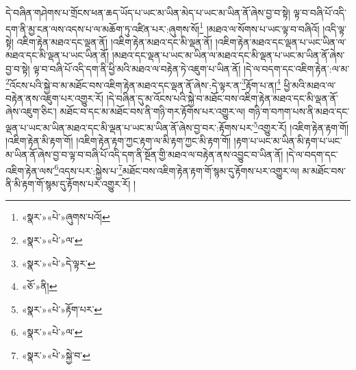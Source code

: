 དེ་བཞིན་གཤེགས་པ་གྲོངས་ཕན་ཆད་ཡོད་པ་ཡང་མ་ཡིན་མེད་པ་ཡང་མ་ཡིན་ནོ་ཞེས་བྱ་བ་སྟེ། ལྟ་བ་བཞི་པོ་འདི་དག་ནི་མྱ་ངན་ལས་འདས་པ་ལ་མཆོག་ཏུ་འཛིན་པར་:ཞུགས་སོ།\footnote{«སྣར་»«པེ་»ཞུགས་པའོ།} །མཐའ་ལ་སོགས་པ་ཡང་ལྟ་བ་བཞིའོ། །འདི་ལྟ་སྟེ། འཇིག་རྟེན་མཐའ་དང་ལྡན་ནོ། །འཇིག་རྟེན་མཐའ་དང་མི་ལྡན་ནོ། །འཇིག་རྟེན་མཐའ་དང་ལྡན་པ་ཡང་ཡིན་ལ་མཐའ་དང་མི་ལྡན་པ་ཡང་ཡིན་ནོ། །མཐའ་དང་ལྡན་པ་ཡང་མ་ཡིན་ལ་མཐའ་དང་མི་ལྡན་པ་ཡང་མ་ཡིན་ནོ་ཞེས་བྱ་བ་སྟེ། ལྟ་བ་བཞི་པོ་འདི་དག་ནི་ཕྱི་མའི་མཐའ་ལ་བརྟེན་ཏེ་འཇུག་པ་ཡིན་ནོ། །དེ་ལ་བདག་དང་འཇིག་རྟེན་:ལ་མ་\footnote{«སྣར་»«པེ་»ལ་}འོངས་པའི་སྐྱེ་བ་མ་མཐོང་བས་འཇིག་རྟེན་མཐའ་དང་ལྡན་ནོ་ཞེས་:དེ་ལྟར་ན་\footnote{«སྣར་»«པེ་»དེ་ལྟར་}རྟོག་པ་ན།\footnote{«ཅོ་»ནི།} ཕྱི་མའི་མཐའ་ལ་བརྟེན་ནས་འཇུག་པར་འགྱུར་རོ། །དེ་བཞིན་དུ་མ་འོངས་པའི་སྐྱེ་བ་མཐོང་བས་འཇིག་རྟེན་མཐའ་དང་མི་ལྡན་ནོ་ཞེས་འཇུག་ཅིང་། མཐོང་བ་དང་མ་མཐོང་བས་ནི་གཉི་གར་རྟོགས་པར་འགྱུར་ལ། གཉི་ག་བཀག་པས་ནི་མཐའ་དང་ལྡན་པ་ཡང་མ་ཡིན་མཐའ་དང་མི་ལྡན་པ་ཡང་མ་ཡིན་ནོ་ཞེས་བྱ་བར་:རྟོགས་པར་\footnote{«སྣར་»«པེ་»རྟོག་པར་}འགྱུར་རོ། །འཇིག་རྟེན་རྟག་གོ། །འཇིག་རྟེན་མི་རྟག་གོ། །འཇིག་རྟེན་རྟག་ཀྱང་རྟག་ལ་མི་རྟག་ཀྱང་མི་རྟག་གོ། །རྟག་པ་ཡང་མ་ཡིན་མི་རྟག་པ་ཡང་མ་ཡིན་ནོ་ཞེས་བྱ་བ་ལྟ་བ་བཞི་པོ་འདི་དག་ནི་སྔོན་གྱི་མཐའ་ལ་བརྟེན་ནས་འབྱུང་བ་ཡིན་ནོ། །དེ་ལ་བདག་དང་འཇིག་རྟེན་ལས་\footnote{«སྣར་»«པེ་»ལ་}འདས་པར་:སྐྱེས་པ་\footnote{«སྣར་»«པེ་»སྐྱེ་བ་}མཐོང་བས་འཇིག་རྟེན་རྟག་གོ་སྙམ་དུ་རྟོགས་པར་འགྱུར་ལ། མ་མཐོང་བས་ནི་མི་རྟག་གོ་སྙམ་དུ་རྟོགས་པར་འགྱུར་རོ། །
